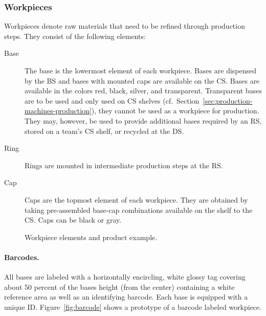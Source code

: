 \documentclass[12pt,twoside]{article}
\newcommand{\refsec}[1]{Section~\ref{#1}}
\newcommand{\reffig}[1]{Figure~\ref{#1}}
\begin{document}
\subsubsection{Workpieces}
\label{sec:workpieces}
Workpieces denote raw materials that need to be refined through production
steps.
They consist of the following elements:
\begin{description}
\item[Base] The base is the lowermost element of each workpiece.
  Bases are dispensed by the \acf{BS} and bases with mounted
  caps are available on the \acf{CS}. Bases are available in
  the colors red, black, silver, and transparent. Transparent bases
  are to be used and only used on \ac{CS} shelves
  (cf.~\refsec{sec:production-machines-production}), they cannot be
  used as a workpiece for production. They may, however, be used to
  provide additional bases required by an \ac{RS}, stored on a team's \ac{CS}
  shelf, or recycled at the \ac{DS}.
\item[Ring] Rings are mounted in intermediate production steps at the \acf{RS}.
\item[Cap] Caps are the topmost element of each workpiece. They are
  obtained by taking pre-assembled base-cap combinations available on
  the shelf to the \acf{CS}. Caps can be black or gray.
\end{description}

\begin{figure}[ht]
  \centering
  \quad
  \quad
  \caption{Workpiece elements and product example.}
  \label{fig:workpieces}
\end{figure}

\paragraph{Barcodes.}
All bases are labeled with a horizontally encircling, white glossy tag
covering about 50 percent of the bases height (from the center)
containing a white reference area as well as an identifying
barcode. Each base is equipped with a unique ID\@. \reffig{fig:barcode}
shows a prototype of a barcode labeled workpiece.
\end{document}
